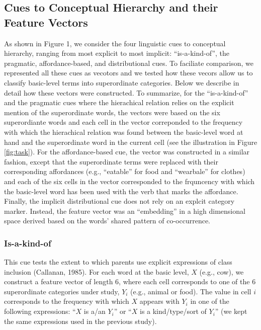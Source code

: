 \documentclass[english,,man]{apa6}
\begin{document}
\hypertarget{cues-to-conceptual-hierarchy-and-their-feature-vectors}{%
\subsection{Cues to Conceptual Hierarchy and their Feature Vectors}\label{cues-to-conceptual-hierarchy-and-their-feature-vectors}}

As shown in Figure 1, we consider the four linguistic cues to conceptual hierarchy, ranging from most explicit to most implicit: \enquote{is-a-kind-of}, the pragmatic, affordance-based, and distributional cues. To faciliate comparison, we represented all these cues as vecotors and we tested how these vecors allow us to classify basic-level terms into superordinate categories. Below we describe in detail how these vectors were constructed. To summarize, for the \enquote{is-a-kind-of} and the pragmatic cues where the hierachical relation relies on the explicit mention of the superordinate words, the vectors were based on the six superordiante words and each cell in the vector correponded to the frequency with which the hierachical relation was found between the basic-level word at hand and the superordinate word in the current cell (see the illustration in Figure \ref{fig:task}). For the affordance-based cue, the vector was constructed in a similar fashion, except that the superordinate terms were replaced with their corresponding affordances (e.g., \enquote{eatable} for food and \enquote{wearbale} for clothes) and each of the six cells in the vector corresponded to the frquncency with which the basic-level word has been used with the verb that marks the affordance. Finally, the implicit distributional cue does not rely on an explcit category marker. Instead, the feature vector was an \enquote{embedding} in a high dimensional space derived based on the words' shared pattern of co-occurrence.

\hypertarget{is-a-kind-of}{%
\subsubsection{Is-a-kind-of}\label{is-a-kind-of}}

This cue tests the extent to which parents use explicit expressions of class inclusion (Callanan, 1985). For each word at the basic level, \(X\) (e.g., cow),
we construct a feature vector of length 6, where each cell corresponds to one of the 6 superordinate categories under study, \(Y_i\) (e.g., animal or food). The value in cell \(i\) corresponds to the frequency with which \(X\) appears with \(Y_i\) in one of the following expressions: \enquote{\(X\) is a/an \(Y_i\)} or \enquote{\(X\) is a kind/type/sort of \(Y_i\)} (we kept the same expressions used in the previous study).
\end{document}
